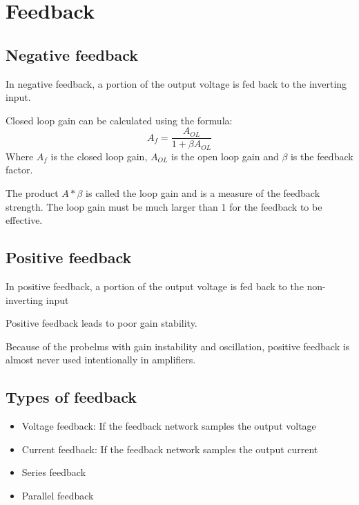 \section{Feedback}

\subsection{Negative feedback}
In negative feedback, a portion of the output voltage is fed back to the inverting input.

Closed loop gain can be calculated using the formula:
$$A_f = \frac{A_{OL}}{1 + \beta A_{OL}}$$
Where $A_f$ is the closed loop gain, $A_{OL}$ is the open loop gain and $\beta$ is the feedback factor.

The product $A* \beta$ is called the loop gain and is a measure of the feedback strength. The loop gain
must be much larger than 1 for the feedback to be effective.

\subsection{Positive feedback}
In positive feedback, a portion of the output voltage is fed back to the non-inverting input

Positive feedback leads to poor gain stability.

Because of the probelms with gain instability and oscillation, positive
feedback is almost never used intentionally in amplifiers.


\subsection{Types of feedback}
\begin{itemize}
	\item{Voltage feedback: If the feedback network samples the output voltage}
	\item{Current feedback: If the feedback network samples the output current}
	\item{Series feedback}
	\item{Parallel feedback}
\end{itemize}


